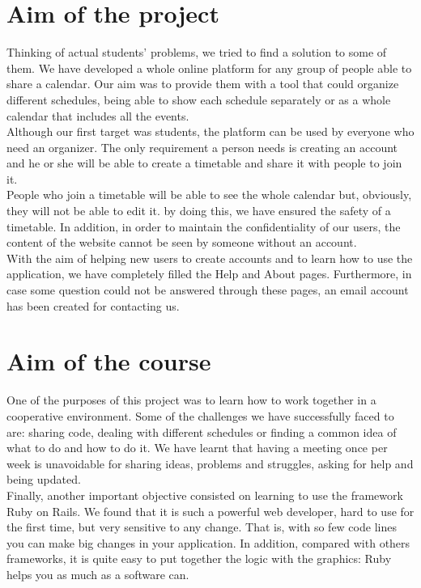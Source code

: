 


\section{Aim of the project}

Thinking of actual students' problems, we tried to find a solution to some of them. We have developed a whole  online platform for any group of people able to share a calendar. Our aim was to provide them with a tool that could organize  different schedules, being able to show each schedule separately or as a whole calendar that includes all the events.\\
Although our first target was students, the platform can be used by everyone who need an organizer. The only requirement a person needs is creating an account and he or she will be able to create a timetable and share it with people to join it.\\
People who join a timetable will be able to see the whole calendar but, obviously, they will not be able to edit it. by doing this, we have ensured the safety of a timetable.  In addition, in order to maintain the confidentiality of our users, the content of the website cannot be seen by someone without an account.\\
With the aim of helping new users to create accounts and to learn how to use the application, we have completely filled the Help and About pages. Furthermore, in case some question could not be answered through these pages, an email account has been created for contacting us.\\

\section{Aim of the course}
One of the purposes of this project was to learn how to work together in a cooperative environment. Some of the challenges we have successfully faced to are: sharing code, dealing with different schedules or finding a common idea of what to do and how to do it. We have learnt that having a meeting once per week is unavoidable for sharing ideas, problems and struggles, asking for help and being updated.\\
Finally, another important objective consisted on learning to use the framework Ruby on Rails. We found that it is such a powerful web developer, hard to use for the first time, but very sensitive to any change. That is, with so few code lines you can make big changes in your application. In addition, compared with others frameworks, it is quite easy to put together the logic with the graphics: Ruby helps you as much as a software can.